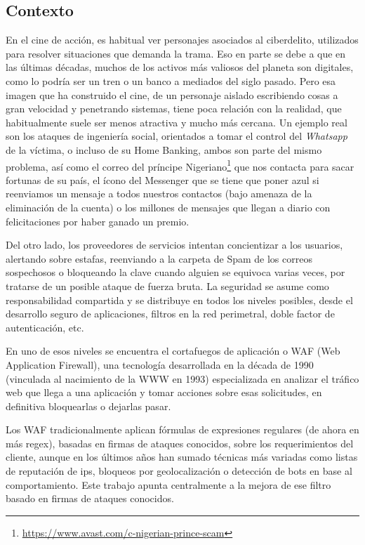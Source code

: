 \documentclass[12pt]{article}
\begin{document}
\subsection{Contexto}
En el cine de acción, es habitual ver personajes asociados al ciberdelito, utilizados para resolver situaciones que demanda la trama. Eso en parte se debe a que en las últimas décadas, muchos de los activos más valiosos del planeta son digitales, como lo podría ser un tren o un banco a mediados del siglo pasado. Pero esa imagen que ha construido el cine, de un personaje aislado escribiendo cosas a gran velocidad y penetrando sistemas, tiene poca relación con la realidad, que habitualmente suele ser menos atractiva y mucho más cercana.
Un ejemplo real son los ataques de ingeniería social, orientados a tomar el control del \textit{Whatsapp} de la víctima, o incluso de su Home Banking, ambos son parte del mismo problema, así como el correo del príncipe Nigeriano\footnote{\url{https://www.avast.com/c-nigerian-prince-scam}} que nos contacta para sacar fortunas de su país, el ícono del Messenger que se tiene que poner azul si reenviamos un mensaje a todos nuestros contactos (bajo amenaza de la eliminación de la cuenta) o los millones de mensajes que llegan a diario con felicitaciones por haber ganado un premio.

Del otro lado, los proveedores de servicios intentan concientizar a los usuarios, alertando sobre estafas, reenviando a la carpeta de Spam de los correos sospechosos o bloqueando la clave cuando alguien se equivoca varias veces, por tratarse de un posible ataque de fuerza bruta. La seguridad se asume como responsabilidad compartida y se distribuye en todos los niveles posibles, desde el desarrollo seguro de aplicaciones, filtros en la red perimetral, doble factor de autenticación, etc.

En uno de esos niveles se encuentra el cortafuegos de aplicación o WAF (Web Application Firewall), una tecnología desarrollada en la década de 1990 (vinculada al nacimiento de la WWW en 1993) especializada en analizar el tráfico web que llega a una aplicación y tomar acciones sobre esas solicitudes, en definitiva bloquearlas o dejarlas pasar.

Los WAF tradicionalmente aplican fórmulas de expresiones regulares (de ahora en más regex), basadas en firmas de ataques conocidos, sobre los requerimientos del cliente, aunque en los últimos años han sumado técnicas más variadas como listas de reputación de ips, bloqueos por geolocalización o detección de bots en base al comportamiento. Este trabajo apunta centralmente a la mejora de ese filtro basado en firmas de ataques conocidos.
\end{document}
